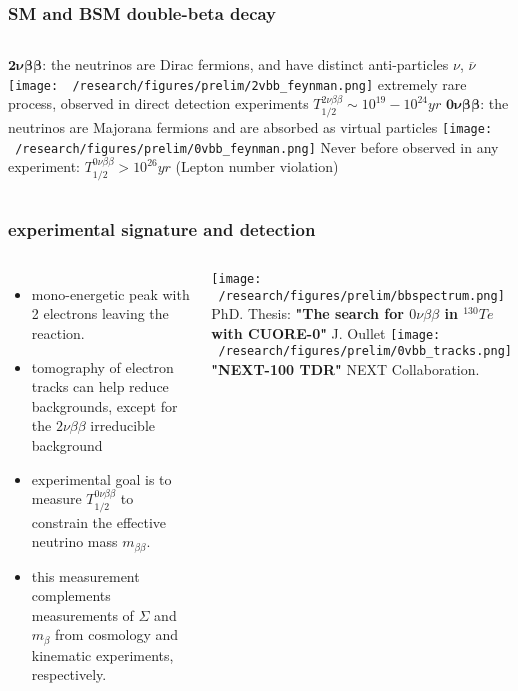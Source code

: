 \documentclass{beamer}
\begin{document}
	\begin{frame}
		\frametitle{SM and BSM double-beta decay}
		\begin{columns}[c] %
			{\footnotesize $\boldsymbol{2\nu\beta\beta}$: the neutrinos are Dirac fermions, and have distinct anti-particles $\nu$, $\overline{\nu}$} 
			\medskip
			\texttt{[image: ~/research/figures/prelim/2vbb\_feynman.png]}
			{\footnotesize extremely rare process, observed in direct detection experiments $T_{1/2}^{2\nu\beta\beta} \sim 10^{19}-10^{24} yr$}
			{\footnotesize $\boldsymbol{0\nu\beta\beta}$: the neutrinos are Majorana fermions and are absorbed as virtual particles}
			\texttt{[image: ~/research/figures/prelim/0vbb\_feynman.png]}
			{\footnotesize Never before observed in any experiment:  $T_{1/2}^{0\nu\beta\beta} > 10^{26} yr$  (Lepton number violation)}
			
		\end{columns}
	\end{frame}		
	
	\begin{frame}
		\frametitle{experimental signature and detection}
		\begin{columns}[c] %
			
			\begin{itemize}
				\setlength\itemsep{2em}
				\item mono-energetic peak with 2 electrons leaving the reaction.
				\item tomography of electron tracks can help reduce backgrounds, except for the $2\nu\beta\beta$ irreducible background
				\item experimental goal is to measure $T_{1/2}^{0\nu\beta\beta}$ to constrain the effective neutrino mass $m_{\beta\beta}$.
				\item this measurement complements measurements of $\Sigma$ and $m_{\beta}$ from cosmology and kinematic experiments, respectively.
			\end{itemize}
			
			\texttt{[image: ~/research/figures/prelim/bbspectrum.png]}
			\\ {\fontsize{4}{12} \selectfont PhD. Thesis: \textbf{"The search for $0\nu\beta\beta$ in $^{130}Te$ with CUORE-0"} J. Oullet}
			\texttt{[image: ~/research/figures/prelim/0vbb\_tracks.png]}
			\\
			{\fontsize{4}{12} \selectfont \textbf{"NEXT-100 TDR"} NEXT Collaboration.}
			
		\end{columns}
	\end{frame}			
	
\end{document}
